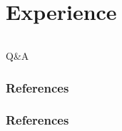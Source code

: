 \documentclass[compress]{beamer} %
\begin{document}
 
 \section{Experience}
  \begin{frame}
   {\Huge
     \vspace {0.15\textwidth}
     \begin{columns}
       \begin{column}{0.3\textwidth}
       \end{column}
       \begin{column}{0.3\textwidth}
       \end{column}
       \begin{column}{0.3\textwidth}
       \end{column}
     \end{columns}
   }
   \vspace {0.025\textwidth}
   \begin{center}
   {\huge Q\&A}
   \end{center}
 \end{frame}

\begin{frame}\frametitle{References}
\frametitle{References}


\end{frame}
\end{document}
